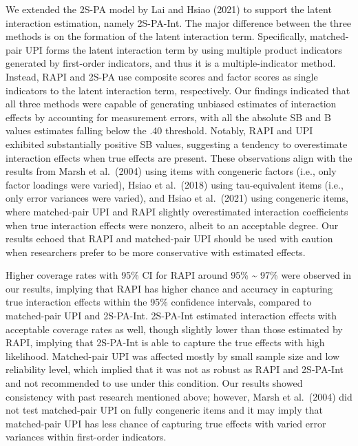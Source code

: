 \documentclass[
  man]{apa7}
\begin{document}
We extended the 2S-PA model by Lai and Hsiao (2021) to support the latent interaction estimation, namely 2S-PA-Int.
The major difference between the three methods is on the formation of the latent interaction term. Specifically, matched-pair UPI forms the latent interaction term by using multiple product indicators generated by first-order indicators, and thus it is a multiple-indicator method. Instead, RAPI and 2S-PA use composite scores and factor scores as single indicators to the latent interaction term, respectively. Our findings indicated that all three methods were capable of generating unbiased estimates of interaction effects by accounting for measurement errors, with all the absolute SB and B values estimates falling below the .40 threshold. Notably, RAPI and UPI exhibited substantially positive SB values, suggesting a tendency to overestimate interaction effects when true effects are present. These observations align with the results from Marsh et al.~(2004) using items with congeneric factors (i.e., only factor loadings were varied), Hsiao et al.~(2018) using tau-equivalent items (i.e., only error variances were varied), and Hsiao et al.~(2021) using congeneric items, where matched-pair UPI and RAPI slightly overestimated interaction coefficients when true interaction effects were nonzero, albeit to an acceptable degree. Our results echoed that RAPI and matched-pair UPI should be used with caution when researchers prefer to be more conservative with estimated effects.

Higher coverage rates with 95\% CI for RAPI around 95\% \textasciitilde{} 97\% were observed in our results, implying that RAPI has higher chance and accuracy in capturing true interaction effects within the 95\% confidence intervals, compared to matched-pair UPI and 2S-PA-Int. 2S-PA-Int estimated interaction effects with acceptable coverage rates as well, though slightly lower than those estimated by RAPI, implying that 2S-PA-Int is able to capture the true effects with high likelihood. Matched-pair UPI was affected mostly by small sample size and low reliability level, which implied that it was not as robust as RAPI and 2S-PA-Int and not recommended to use under this condition. Our results showed consistency with past research mentioned above; however, Marsh et al.~(2004) did not test matched-pair UPI on fully congeneric items and it may imply that matched-pair UPI has less chance of capturing true effects with varied error variances within first-order indicators.
\end{document}
